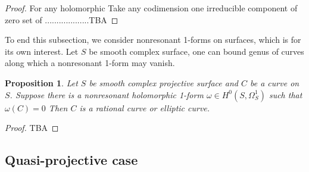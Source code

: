 \documentclass[a4paper,12pt,reqno]{amsart}
\theoremstyle{plain}
\newtheorem{proposition}[theorem]{Proposition}
\theoremstyle{remark}
\begin{document}
 \begin{proof}
 For any holomorphic Take any codimension one irreducible component of zero set of  ...................TBA
 \end{proof}
 
 
 
 To end this subsection, we consider nonresonant 1-forms on surfaces, which is for its own interest. Let $S$ be smooth complex surface, one can bound genus of curves along which a nonresonant 1-form may vanish.
 
 \begin{proposition}
 Let $S$ be smooth complex projective surface and $C$ be a curve on $S$. Suppose there is a nonresonant holomorphic 1-form $\omega\in H^0(S, \Omega_S^1)$ such that $\omega(C)=0$ Then $C$ is a rational curve or elliptic curve.
 \end{proposition}
 
 
 \begin{proof}
 TBA
 \end{proof}
 
 
 
 
 
 
 
 
 
 
 
 \subsection{Quasi-projective case}
 
\end{document}
